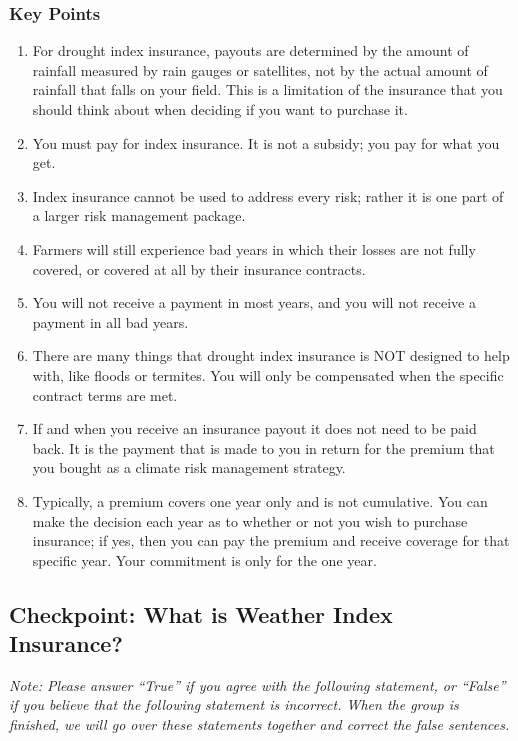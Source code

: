 \documentclass[letterpaper,10pt,english]{sphinxmanual}
\begin{document}
\subsubsection{Key Points}
\label{whatisindexinsurance/weather/weatherindexinsurance_en:key-points}\begin{enumerate}
\item {} 
For drought index insurance, payouts are determined by the amount of rainfall measured by rain gauges or satellites, not by the actual amount of rainfall that falls on your field.  This is a limitation of the insurance that you should think about when deciding if you want to purchase it.

\item {} 
You must pay for index insurance.  It is not a subsidy; you pay for what you get.

\item {} 
Index insurance cannot be used to address every risk; rather it is one part of a larger risk management package.

\item {} 
Farmers will still experience bad years in which their losses are not fully covered, or covered at all by their insurance contracts.

\item {} 
You will not receive a payment in most years, and you will not receive a payment in all bad years.

\item {} 
There are many things that drought index insurance is NOT designed to help with, like floods or termites. You will only be compensated when the specific contract terms are met.

\item {} 
If and when you receive an insurance payout it does not need to be paid back. It is the payment that is made to you in return for the premium that you bought as a climate risk management strategy.

\item {} 
Typically, a premium covers one year only and is not cumulative. You can make the decision each year as to whether or not you wish to purchase insurance; if yes, then you can pay the premium and receive coverage for that specific year. Your commitment is only for the one year.

\end{enumerate}


\subsection{Checkpoint: What is Weather Index Insurance?}
\label{whatisindexinsurance/weather/weatherindexinsurance_en:checkpoint-what-is-weather-index-insurance}
\emph{Note: Please answer ``True'' if you agree with the following statement, or ``False'' if you believe that the following statement is incorrect. When the group is finished, we will go over these statements together and correct the false sentences.}
\end{document}
